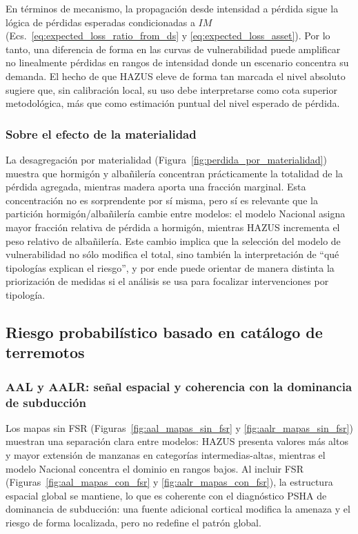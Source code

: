 En términos de mecanismo, la propagación desde intensidad a pérdida sigue la lógica de pérdidas esperadas condicionadas a $IM$ (Ecs.~\ref{eq:expected_loss_ratio_from_ds} y \ref{eq:expected_loss_asset}). Por lo tanto, una diferencia de forma en las curvas de vulnerabilidad puede amplificar no linealmente pérdidas en rangos de intensidad donde un escenario concentra su demanda. El hecho de que HAZUS eleve de forma tan marcada el nivel absoluto sugiere que, sin calibración local, su uso debe interpretarse como cota superior metodológica, más que como estimación puntual del nivel esperado de pérdida.

\subsubsection{Sobre el efecto de la materialidad}
\label{subsubsec:disc_riesgo_materialidad}

La desagregación por materialidad (Figura~\ref{fig:perdida_por_materialidad}) muestra que hormigón y albañilería concentran prácticamente la totalidad de la pérdida agregada, mientras madera aporta una fracción marginal. Esta concentración no es sorprendente por sí misma, pero sí es relevante que la partición hormigón/albañilería cambie entre modelos: el modelo Nacional asigna mayor fracción relativa de pérdida a hormigón, mientras HAZUS incrementa el peso relativo de albañilería. Este cambio implica que la selección del modelo de vulnerabilidad no sólo modifica el total, sino también la interpretación de ``qué tipologías explican el riesgo'', y por ende puede orientar de manera distinta la priorización de medidas si el análisis se usa para focalizar intervenciones por tipología.


\subsection{Riesgo probabilístico basado en catálogo de terremotos}
\label{subsec:disc_riesgo_event_based}

\subsubsection{AAL y AALR: señal espacial y coherencia con la dominancia de subducción}
\label{subsubsec:disc_aal_aalr}

Los mapas sin FSR (Figuras~\ref{fig:aal_mapas_sin_fsr} y \ref{fig:aalr_mapas_sin_fsr}) muestran una separación clara entre modelos: HAZUS presenta valores más altos y mayor extensión de manzanas en categorías intermedias-altas, mientras el modelo Nacional concentra el dominio en rangos bajos. Al incluir FSR (Figuras~\ref{fig:aal_mapas_con_fsr} y \ref{fig:aalr_mapas_con_fsr}), la estructura espacial global se mantiene, lo que es coherente con el diagnóstico PSHA de dominancia de subducción: una fuente adicional cortical modifica la amenaza y el riesgo de forma localizada, pero no redefine el patrón global.

